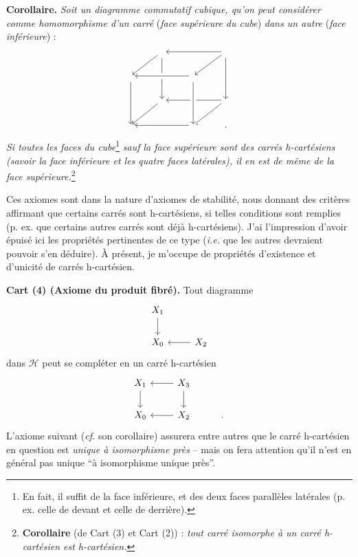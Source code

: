\documentclass[11pt]{article}
\newcommand{\msp}[1]{\marginnote{\footnotesize [#1]}}
\begin{document}
\noindent\textbf{Corollaire.} \textit{Soit un diagramme commutatif cubique, qu'on peut considérer comme homomorphisme d'un carré} (\textit{face supérieure du cube}) \textit{dans un autre} (\textit{face inférieure}) :
\[
\begin{tikzcd}
 & {} \arrow[dl] \arrow[dd] & & {} \arrow[ll] \arrow[dl] \arrow[dd] \\
{} \arrow[dd] & & {} \arrow[ll, crossing over] & \\
 & {} \arrow[dl] & & {} \arrow[ll] \arrow[dl] \\
{} & & {} \arrow[ll] \arrow[from=uu, crossing over] & .
\end{tikzcd}
\]
\textit{Si toutes les faces du cube}\footnote{En fait, il suffit de la face inférieure, et des deux faces parallèles latérales (p. ex. celle de devant et celle de derrière).} \textit{sauf la face supérieure sont} \msp{page 4} \textit{des carrés h-cartésiens (savoir la face inférieure et les quatre faces latérales), il en est de même de la face supérieure.}\footnote{\textbf{Corollaire} (de Cart (3) et Cart (2)) : \textit{tout carré isomorphe à un carré h-cartésien est h-cartésien.}}

\noindent Ces axiomes sont dans la nature d'axiomes de stabilité, nous donnant des critères affirmant que certains carrés sont h-cartésiens, si telles conditions sont remplies (p. ex. que certains autres carrés sont déjà h-cartésiens). J'ai l'impression d'avoir épuisé ici les propriétés pertinentes de ce type (\textit{i.e.} que les autres devraient pouvoir s'en déduire). À présent, je m'occupe de propriétés d'existence et d'unicité de carrés h-cartésien. %

\noindent\textbf{Cart (4) (Axiome du produit fibré).} Tout diagramme
\[
\begin{tikzcd}
X_1 \arrow[d] & \\
X_0 & X_2 \arrow[l]
\end{tikzcd}
\]
dans $\mathcal{H}$ peut se compléter en un carré h-cartésien
\[
\begin{tikzcd}
X_1 \arrow[d] & X_3 \arrow[l] \arrow[d] & \\
X_0 & X_2 \arrow[l] & .
\end{tikzcd}
\]
L'axiome suivant (\textit{cf.} son corollaire) assurera entre autres que le carré h-cartésien en question est \textit{unique à isomorphisme près} – mais on fera attention qu'il n'est en général pas unique “à isomorphisme unique près”.
\end{document}
